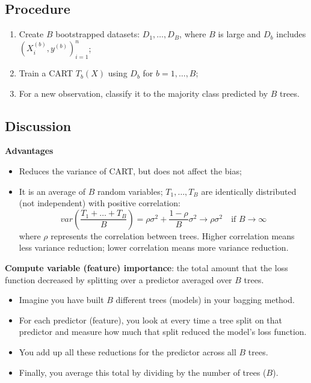 \documentclass[12pt]{book}
\theoremstyle{definition}
\theoremstyle{remark}
\begin{document}
\subsection{Procedure}
\begin{enumerate}
    \item Create $B$ bootstrapped datasets: $D_1,\dots,D_B$, where $B$ is large and $D_b$ includes $(X_i^{(b)},y^{(b)})_{i=1}^n$;
    \item Train a CART $T_b(X)$ using $D_b$ for $b = 1,\dots, B$;
    \item For a new observation, classify it to the majority class predicted by $B$ trees.
\end{enumerate}

\subsection{Discussion}
\textbf{Advantages}
\begin{itemize}
    \item Reduces the variance of CART, but does not affect the bias;
    \item It is an average of $B$ random variables;
    $T_1,\dots,T_B$ are identically distributed (not independent) with positive correlation:
    \[var (\frac{T_1+\dots+T_B}{B}) = \rho\sigma^2+\frac{1-\rho}{B}\sigma^2 \rightarrow \rho\sigma^2\quad \text{if }B \rightarrow \infty\]
    where $\rho$ represents the correlation between trees. Higher correlation means less variance reduction; lower correlation means more variance reduction.
\end{itemize}

\begin{notionbox}[Notes]
    \textbf{Compute variable (feature) importance}: the total amount that the loss function decreased by splitting over a predictor averaged over $B$ trees.\\
    \begin{itemize}
        \item Imagine you have built $B$ different trees (models) in your bagging method.
        \item For each predictor (feature), you look at every time a tree split on that predictor and measure how much that split reduced the model's loss function. 
        \item You add up all these reductions for the predictor across all $B$ trees.
        \item Finally, you average this total by dividing by the number of trees ($B$).
    \end{itemize}
\end{notionbox}
\end{document}
